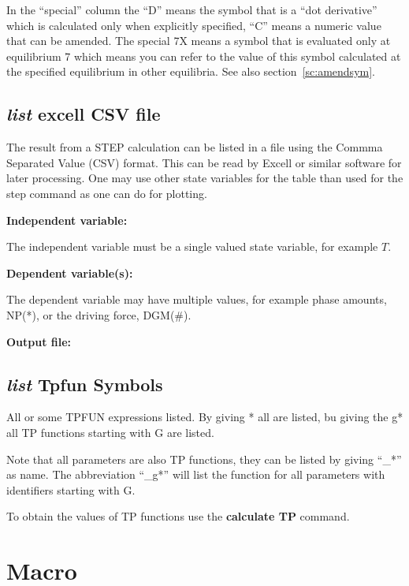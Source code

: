 \documentclass[11pt]{article}
\begin{document}
In the ``special'' column the ``D'' means the symbol that is a ``dot
derivative'' which is calculated only when explicitly specified, ``C''
means a numeric value that can be amended.  The special 7X means a
symbol that is evaluated only at equilibrium 7 which means you can
refer to the value of this symbol calculated at the specified
equilibrium in other equilibria.  See also section~\ref{sc:amendsym}.

\hypertarget{List excell CSV}{}
\subsection{{\em list} excell CSV file}

The result from a STEP calculation can be listed in a file using the
Commma Separated Value (CSV) format.  This can be read by Excell or
similar software for later processing.  One may use other state
variables for the table than used for the step command as one can do
for plotting.

{\bf Independent variable:}

The independent variable must be a single valued state variable, for
example $T$.

{\bf Dependent variable(s):}

The dependent variable may have multiple values, for example phase
amounts, NP(*), or the driving force, DGM(\#).

{\bf Output file:}

\hypertarget{List TPfun}{}
\subsection{{\em list} Tpfun Symbols}

All or some TPFUN expressions listed.  By giving * all are listed,
bu giving the g* all TP functions starting with G are listed.

Note that all parameters are also TP functions, they can be listed by
giving ``\_*'' as name.  The abbreviation ``\_g*'' will list the
function for all parameters with identifiers starting with G.

To obtain the values of TP functions use the {\bf calculate TP}
command.

\hypertarget{Macro}{}
\section{Macro }
\end{document}
